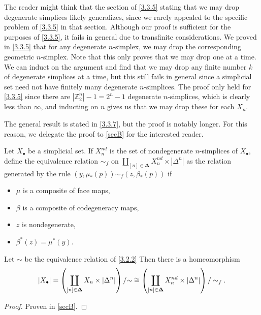 \begin{remark}\label{3.3.6}
	The reader might think that the section of \cref{3.3.5} stating that we may drop degenerate simplices likely generalizes, since we rarely appealed to the specific problem of \cref{3.3.5} in that section. Although our proof is sufficient for the purposes of \cref{3.3.5}, it fails in general due to transfinite considerations. We proved in \cref{3.3.5} that for any degenerate $n$-simplex, we may drop the corresponding geometric $n$-simplex. Note that this only proves that we may drop one at a time. We can induct on the argument and find that we may drop any finite number $k$ of degenerate simplices at a time, but this still fails in general since a simplicial set need not have finitely many degenerate $n$-simplices. The proof only held for \cref{3.3.5} since there are $\left| \mathbb{Z}^n_2 \right| -1=2^n-1$ degenerate $n$-simplices, which is clearly less than $\infty $, and inducting on $n$ gives us that we may drop these for each $X_n$.

	The general result is stated in \cref{3.3.7}, but the proof is notably longer. For this reason, we delegate the proof to \cref{secB} for the interested reader.
\end{remark}

\begin{proposition}\label{3.3.7}
	Let $X_\bullet$ be a simplicial set. If $X_n^{nd} $ is the set of nondegenerate $n$-simplices of $X_{\bullet} $, define the equivalence relation $\sim_f $ on $\coprod_{[n]\in\boldsymbol{\Delta} } X_n^{nd} \times \left| \Delta^n \right|$ as the relation generated by the rule $(y,\mu_*(p))\sim_f(z,\beta_*(p))$ if
	\begin{itemize}
		\item $\mu$ is a composite of face maps,
		\item $\beta$ is a composite of codegeneracy maps,
		\item $z$ is nondegenerate,
		\item $\beta^*(z)=\mu^*(y)$.
	\end{itemize}
	Let $\sim$ be the equivalence relation of \cref{3.2.2} Then there is a homeomorphism
	\[
		\left| X_{\bullet}  \right| =\left( \coprod_{[n]\in\boldsymbol{\Delta} } X_n\times \left| \Delta^n \right|  \right) /\mathbin{\sim} \cong \left( \coprod_{[n]\in\boldsymbol{\Delta} } X_n^{nd} \times \left| \Delta^n \right|  \right) /\mathbin{\sim} _f
	.\]
\end{proposition}
\begin{proof}
	Proven in \cref{secB}.
\end{proof}

